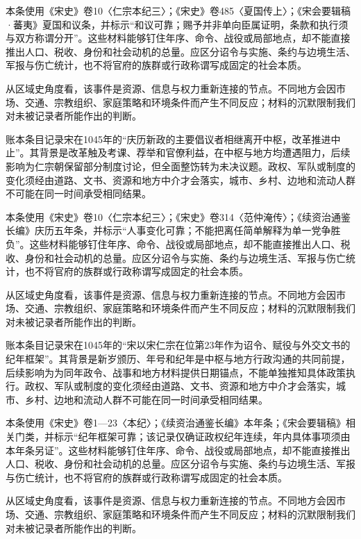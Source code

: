本条使用《宋史》卷10〈仁宗本纪三〉；《宋史》卷485〈夏国传上〉；《宋会要辑稿·蕃夷》夏国和议条，并标示“和议可靠；赐予并非单向臣属证明，条款和执行须与双方称谓分开”。这些材料能够钉住年序、命令、战役或局部地点，却不能直接推出人口、税收、身份和社会动机的总量。应区分诏令与实施、条约与边境生活、军报与伤亡统计，也不将官府的族群或行政称谓写成固定的社会本质。

从区域史角度看，该事件是资源、信息与权力重新连接的节点。不同地方会因市场、交通、宗教组织、家庭策略和环境条件而产生不同反应；材料的沉默限制我们对未被记录者所能作出的判断。

账本条目记录宋在1045年的“庆历新政的主要倡议者相继离开中枢，改革推进中止”。其背景是改革触及考课、荐举和官僚利益，在中枢与地方均遭遇阻力，后续影响为仁宗朝保留部分制度讨论，但全面整饬转为未决议题。政权、军队或制度的变化须经由道路、文书、资源和地方中介才会落实，城市、乡村、边地和流动人群不可能在同一时间承受相同结果。

本条使用《宋史》卷10〈仁宗本纪三〉；《宋史》卷314〈范仲淹传〉；《续资治通鉴长编》庆历五年条，并标示“人事变化可靠；不能把离任简单解释为单一党争胜负”。这些材料能够钉住年序、命令、战役或局部地点，却不能直接推出人口、税收、身份和社会动机的总量。应区分诏令与实施、条约与边境生活、军报与伤亡统计，也不将官府的族群或行政称谓写成固定的社会本质。

从区域史角度看，该事件是资源、信息与权力重新连接的节点。不同地方会因市场、交通、宗教组织、家庭策略和环境条件而产生不同反应；材料的沉默限制我们对未被记录者所能作出的判断。

账本条目记录宋在1045年的“宋以宋仁宗在位第23年作为诏令、赋役与外交文书的纪年框架”。其背景是新岁颁历、年号和纪年是中枢与地方行政沟通的共同前提，后续影响为为同年政令、战事和地方材料提供日期锚点，不能单独推知具体政策执行。政权、军队或制度的变化须经由道路、文书、资源和地方中介才会落实，城市、乡村、边地和流动人群不可能在同一时间承受相同结果。

本条使用《宋史》卷1—23〈本纪〉；《续资治通鉴长编》本年条；《宋会要辑稿》相关门类，并标示“纪年框架可靠；该记录仅确证政权纪年连续，年内具体事项须由本年条另证”。这些材料能够钉住年序、命令、战役或局部地点，却不能直接推出人口、税收、身份和社会动机的总量。应区分诏令与实施、条约与边境生活、军报与伤亡统计，也不将官府的族群或行政称谓写成固定的社会本质。

从区域史角度看，该事件是资源、信息与权力重新连接的节点。不同地方会因市场、交通、宗教组织、家庭策略和环境条件而产生不同反应；材料的沉默限制我们对未被记录者所能作出的判断。

